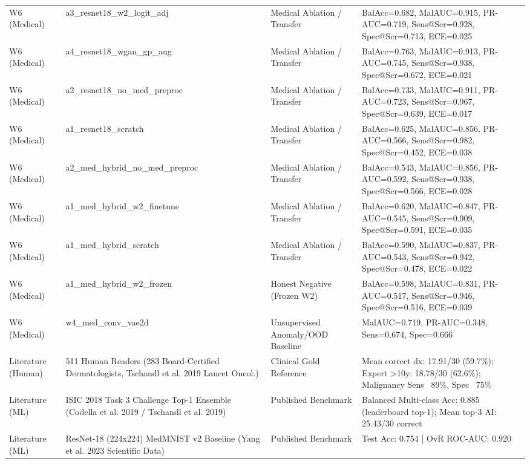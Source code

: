 \begin{tabular}{p{2.2cm}p{4.1cm}p{3.0cm}p{5.5cm}}
W6 (Medical) & a3\_resnet18\_w2\_logit\_adj & Medical Ablation / Transfer & BalAcc=0.682, MalAUC=0.915, PR-AUC=0.719, Sens@Scr=0.928, Spec@Scr=0.713, ECE=0.025 \\
W6 (Medical) & a4\_resnet18\_wgan\_gp\_aug & Medical Ablation / Transfer & BalAcc=0.763, MalAUC=0.913, PR-AUC=0.745, Sens@Scr=0.938, Spec@Scr=0.672, ECE=0.021 \\
W6 (Medical) & a2\_resnet18\_no\_med\_preproc & Medical Ablation / Transfer & BalAcc=0.733, MalAUC=0.911, PR-AUC=0.723, Sens@Scr=0.967, Spec@Scr=0.639, ECE=0.017 \\
W6 (Medical) & a1\_resnet18\_scratch & Medical Ablation / Transfer & BalAcc=0.625, MalAUC=0.856, PR-AUC=0.566, Sens@Scr=0.982, Spec@Scr=0.452, ECE=0.038 \\
W6 (Medical) & a2\_med\_hybrid\_no\_med\_preproc & Medical Ablation / Transfer & BalAcc=0.543, MalAUC=0.856, PR-AUC=0.592, Sens@Scr=0.938, Spec@Scr=0.566, ECE=0.028 \\
W6 (Medical) & a1\_med\_hybrid\_w2\_finetune & Medical Ablation / Transfer & BalAcc=0.620, MalAUC=0.847, PR-AUC=0.545, Sens@Scr=0.909, Spec@Scr=0.591, ECE=0.035 \\
W6 (Medical) & a1\_med\_hybrid\_scratch & Medical Ablation / Transfer & BalAcc=0.590, MalAUC=0.837, PR-AUC=0.543, Sens@Scr=0.942, Spec@Scr=0.478, ECE=0.022 \\
W6 (Medical) & a1\_med\_hybrid\_w2\_frozen & Honest Negative (Frozen W2) & BalAcc=0.598, MalAUC=0.831, PR-AUC=0.517, Sens@Scr=0.946, Spec@Scr=0.516, ECE=0.039 \\
W6 (Medical) & w4\_med\_conv\_vae2d & Unsupervised Anomaly/OOD Baseline & MalAUC=0.719, PR-AUC=0.348, Sens=0.674, Spec=0.666 \\
Literature (Human) & 511 Human Readers (283 Board-Certified Dermatologists, Tschandl et al. 2019 Lancet Oncol.) & Clinical Gold Reference & Mean correct dx: 17.91/30 (59.7\%); Expert >10y: 18.78/30 (62.6\%); Malignancy Sens ~89\%, Spec ~75\% \\
Literature (ML) & ISIC 2018 Task 3 Challenge Top-1 Ensemble (Codella et al. 2019 / Tschandl et al. 2019) & Published Benchmark & Balanced Multi-class Acc: 0.885 (leaderboard top-1); Mean top-3 AI: 25.43/30 correct \\
Literature (ML) & ResNet-18 (224x224) MedMNIST v2 Baseline (Yang et al. 2023 Scientific Data) & Published Benchmark & Test Acc: 0.754 | OvR ROC-AUC: 0.920 \\
\bottomrule
\end{tabular}
